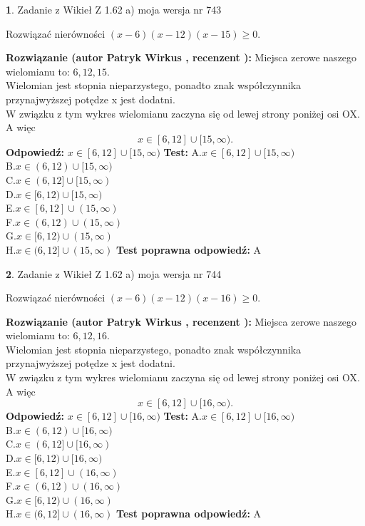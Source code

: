 \documentclass[12pt, a4paper]{article}
\theoremstyle{definition} %
\newtheorem{zad}{}
\newcommand{\zadStart}[1]{\begin{zad}#1\newline}
\newcommand{\zadStop}{\end{zad}}
\newcommand{\rozwStart}[2]{\noindent \textbf{Rozwiązanie (autor #1 , recenzent #2): }\newline}
\newcommand{\rozwStop}{\newline}
\newcommand{\odpStart}{\noindent \textbf{Odpowiedź:}\newline}
\newcommand{\odpStop}{\newline}
\newcommand{\testStart}{\noindent \textbf{Test:}\newline}
\newcommand{\testStop}{\newline}
\newcommand{\kluczStart}{\noindent \textbf{Test poprawna odpowiedź:}\newline}
\newcommand{\kluczStop}{\newline}
\begin{document}
\zadStart{Zadanie z Wikieł Z 1.62 a) moja wersja nr 743}

Rozwiązać nierówności $(x-6)(x-12)(x-15)\ge0$.
\zadStop
\rozwStart{Patryk Wirkus}{}
Miejsca zerowe naszego wielomianu to: $6, 12, 15$.\\
Wielomian jest stopnia nieparzystego, ponadto znak współczynnika przy\linebreak najwyższej potędze x jest dodatni.\\ W związku z tym wykres wielomianu zaczyna się od lewej strony poniżej osi OX. A więc $$x \in [6,12] \cup [15,\infty).$$
\rozwStop
\odpStart
$x \in [6,12] \cup [15,\infty)$
\odpStop
\testStart
A.$x \in [6,12] \cup [15,\infty)$\\
B.$x \in (6,12) \cup [15,\infty)$\\
C.$x \in (6,12] \cup [15,\infty)$\\
D.$x \in [6,12) \cup [15,\infty)$\\
E.$x \in [6,12] \cup (15,\infty)$\\
F.$x \in (6,12) \cup (15,\infty)$\\
G.$x \in [6,12) \cup (15,\infty)$\\
H.$x \in (6,12] \cup (15,\infty)$
\testStop
\kluczStart
A
\kluczStop



\zadStart{Zadanie z Wikieł Z 1.62 a) moja wersja nr 744}

Rozwiązać nierówności $(x-6)(x-12)(x-16)\ge0$.
\zadStop
\rozwStart{Patryk Wirkus}{}
Miejsca zerowe naszego wielomianu to: $6, 12, 16$.\\
Wielomian jest stopnia nieparzystego, ponadto znak współczynnika przy\linebreak najwyższej potędze x jest dodatni.\\ W związku z tym wykres wielomianu zaczyna się od lewej strony poniżej osi OX. A więc $$x \in [6,12] \cup [16,\infty).$$
\rozwStop
\odpStart
$x \in [6,12] \cup [16,\infty)$
\odpStop
\testStart
A.$x \in [6,12] \cup [16,\infty)$\\
B.$x \in (6,12) \cup [16,\infty)$\\
C.$x \in (6,12] \cup [16,\infty)$\\
D.$x \in [6,12) \cup [16,\infty)$\\
E.$x \in [6,12] \cup (16,\infty)$\\
F.$x \in (6,12) \cup (16,\infty)$\\
G.$x \in [6,12) \cup (16,\infty)$\\
H.$x \in (6,12] \cup (16,\infty)$
\testStop
\kluczStart
A
\kluczStop
\end{document}
